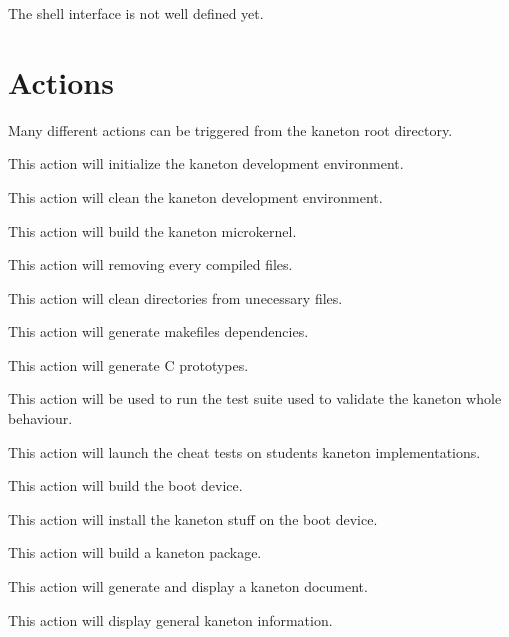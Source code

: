 The shell interface is not well defined yet.

%
%

\section{Actions}

Many different actions can be triggered from the kaneton root directory.

        {This action will initialize the kaneton development environment.}

	{This action will clean the kaneton development environment.}

	{This action will build the kaneton microkernel.}

	{This action will removing every compiled files.}

	{This action will clean directories from unecessary files.}

	{This action will generate makefiles dependencies.}

	{This action will generate C prototypes.}

	{This action will be used to run the test suite used to validate
	  the kaneton whole behaviour.}

	{This action will launch the cheat tests on students kaneton
	  implementations.}

	{This action will build the boot device.}

	{This action will install the kaneton stuff on the boot device.}

	{This action will build a kaneton package.}

	{This action will generate and display a kaneton document.}

	{This action will display general kaneton information.}
